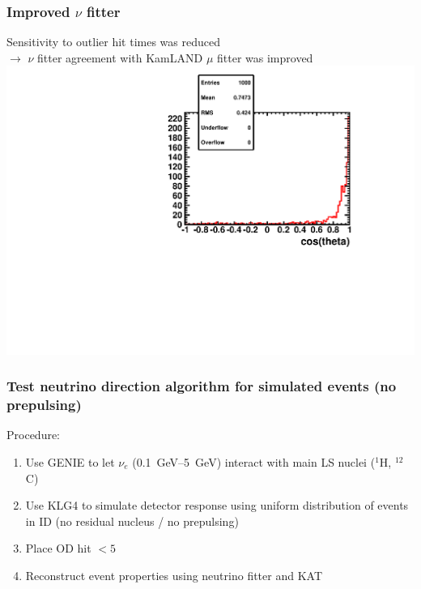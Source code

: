 \documentclass{beamer}
\begin{document}
\begin{frame}
	\frametitle{Improved $\nu$ fitter}
	Sensitivity to outlier hit times was reduced \\
	$\rightarrow$ $\nu$ fitter agreement with KamLAND $\mu$ fitter was improved
	\includegraphics[width=\textwidth]{analyzed_rtq_run005000_agreementWithMuonFitter_t0Peak_prepulseCut1_0_05maxQThres_1000evts.pdf}
\end{frame}

\begin{frame}
	\frametitle{Test neutrino direction algorithm for simulated events (no prepulsing)}
	Procedure:
	\begin{enumerate}
		\item Use GENIE to let $\nu_{e}$
			(\SIrange[range-phrase=--]{0.1}{5}{\giga\electronvolt}) interact
			with main LS nuclei ($^{1}$H, $^{12}$C) 
		\item Use KLG4 to simulate detector response using uniform distribution
			of events in ID (no residual nucleus / no prepulsing)
		\item Place OD hit $< 5$
		\item Reconstruct event properties using neutrino fitter and
			KAT
	\end{enumerate}
\end{frame}
\end{document}
